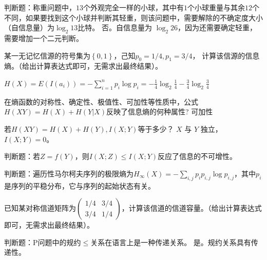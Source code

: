 \begin{problem}
	判断题：称重问题中，$13$个外观完全一样的小球，其中有$1$个小球重量与其余$12$个不同，如果要找到这个小球并判断其轻重，则该问题中，需要解除的不确定度大小（自信息量）为$\log_2 13$比特。
	\solution 否。自信息量为 $\log_2 26$，因为还需要确定轻重，需要增加一个二元判断。
\end{problem}

\begin{problem}
	某一无记忆信源的符号集为$\left\{0,1\right\}$，己知$p_0= 1/4,p_1=3/4$， 计算该信源的信息熵。（给出计算表达式即可，无需求出最终结果）。
\end{problem}
\begin{solution}
	$H(X) = E(I(a_i)) = -\sum_{i = 1}^np_i\log p_i = -\frac{1}{4}\log_2 \frac{1}{4} - \frac{3}{4}\log_2 \frac{3}{4}$
\end{solution}

\begin{problem}
	在熵函数的对称性、确定性、极值性、可加性等性质中，公式$H(XY)=H(X)+H(Y|X)$反映了信息熵的何种属性?
	\solution 可加性
\end{problem}

\begin{problem}
	若$H(XY)=H(X)+H(Y),I(X;Y)$等于多少？
	\solution $X$ 与 $Y$ 独立，$I(X; Y) = 0$。
\end{problem}

\begin{problem}[\todo]
	判断题：若$Z=f(Y)$，则$I(X;Z)\le I(X;Y)$反应了信息的不可增性。
	\solution
\end{problem}

\begin{problem}[\todo]
	判断题：遍历性马尔柯夫序列的极限熵为$H_\infty(X)=-\sum_{i,j}p_ip_{i,j}\log p_{i,j}$，其中$p_i$是序列的平稳分布，它与序列的起始状态有关。
	\solution
\end{problem}

\begin{problem}[\todo]
	已知某对称信道矩阵为$\begin{pmatrix}1/4&3/4\\3/4&1/4\end{pmatrix}$，计算该信道的信道容量。（给出计算表达式即可，无需求出最终结果）。
	\solution
\end{problem}

\begin{problem}
	判断题：P问题中的规约$\le$关系在语言上是一种传递关系。
	\solution 是。规约关系具有传递性。
\end{problem}

